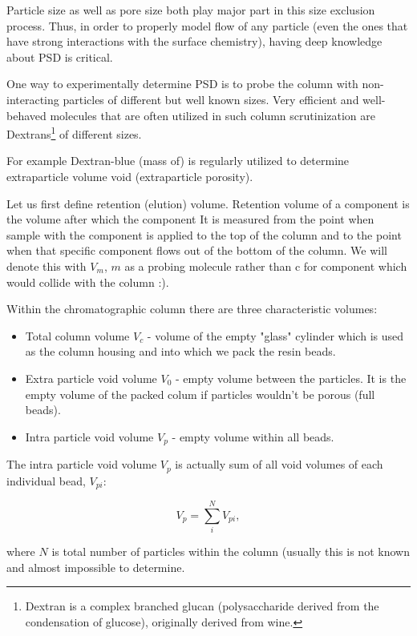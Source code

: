 Particle size as well as pore size both play major part in this size exclusion
process. Thus, in order to properly model flow of any particle (even the ones
that have strong interactions with the surface chemistry), having deep
knowledge about PSD is critical.

One way to experimentally determine PSD is to probe the column with
non-interacting particles of different but well known sizes. Very efficient and
well-behaved molecules that are often utilized in such column scrutinization
are Dextrans\footnote{Dextran is a complex branched glucan (polysaccharide
derived from the condensation of glucose), originally derived from wine.} 
of different sizes.


For example Dextran-blue (mass of) is regularly utilized to determine
extraparticle volume void (extraparticle porosity).

Let us first define retention (elution) volume. Retention volume of a component 
is the volume after which the component It is measured from the point when
sample with the component is applied to the top of the column and to the point when that
specific component flows out of the bottom of the column. We will denote this
with $V_m$, $m$ as a probing molecule rather than c for component which would collide
with the column :).

Within the chromatographic column there are three characteristic volumes:

\begin{itemize}
    \item Total column volume $V_c$ - volume of the empty "glass" cylinder which is
        used as the column housing and into which we pack the resin beads. 
    \item Extra particle void volume $V_0$ - empty volume between the
        particles. It is the empty volume of the packed colum if particles
        wouldn't be porous (full beads).
    \item Intra particle void volume $V_{p}$ - empty volume within all beads.
\end{itemize}

The intra particle void volume $V_{p}$ is actually sum of all void volumes of
each individual bead, $V_{pi}$:

\[V_p = \sum_{i}^{N}V_{pi},\]

where $N$ is total number of particles within the column (usually this is not
known and almost impossible to determine.



